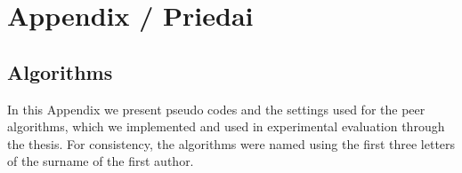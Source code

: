 \renewcommand{\thesection}{\alph{section}}
	
\chapter*{Appendix / Priedai}
\label{cha:appendixA}

\renewcommand{\thefigure}{A.\arabic{figure}}   
\setcounter{figure}{0}
\renewcommand{\thetable}{A.\arabic{table}}
\setcounter{table}{0}

\section{Algorithms}

In this Appendix we present pseudo codes and the settings used for the peer algorithms, which we implemented and used in experimental evaluation through the thesis. For consistency, the algorithms were named using the first three letters of the surname of the first author.

